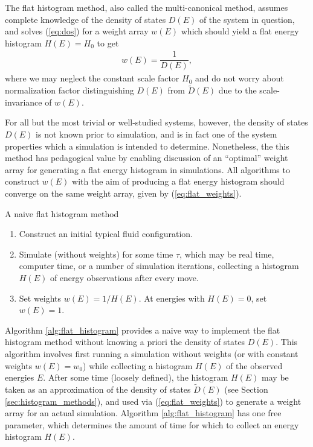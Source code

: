 \documentclass[11pt]{article}
\newcommand{\f}[2]{\dfrac{#1}{#2}} %
\newcommand{\p}[1]{\left(#1\right)} %
\newenvironment{alg}
{\hrulefill\begin{enumerate}}
{\end{enumerate}\hrulefill}
\begin{document}
The flat histogram method, also called the multi-canonical method,
assumes complete knowledge of the density of states $D\p{E}$ of the
system in question, and solves (\ref{eq:dos}) for a weight array
$w\p{E}$ which should yield a flat energy histogram $H\p E=H_0$ to get
\begin{align}
  w\p E=\f1{D\p E},
  \label{eq:flat_weights}
\end{align}
where we may neglect the constant scale factor $H_0$ and do not worry
about normalization factor distinguishing $D\p{E}$ from $\tilde
D\p{E}$ due to the scale-invariance of $w\p{E}$.

For all but the most trivial or well-studied systems, however, the
density of states $D\p{E}$ is not known prior to simulation, and is in
fact one of the system properties which a simulation is intended to
determine. Nonetheless, the this method has pedagogical value by
enabling discussion of an ``optimal'' weight array for generating a
flat energy histogram in simulations. All algorithms to construct
$w\p{E}$ with the aim of producing a flat energy histogram should
converge on the same weight array, given by (\ref{eq:flat_weights}).

\begin{algorithm}[b]
  \caption{A naive flat histogram method}
  \label{alg:flat_histogram}
  \begin{alg}

  \item Construct an initial typical fluid configuration.

  \item Simulate (without weights) for some time $\tau$, which may be
    real time, computer time, or a number of simulation iterations,
    collecting a histogram $H\p{E}$ of energy observations after every
    move.

  \item Set weights $w\p{E}=1/H\p{E}$. At energies with $H\p{E}=0$,
    set $w\p{E}=1$.

  \end{alg}
\end{algorithm}

Algorithm \ref{alg:flat_histogram} provides a naive way to implement
the flat histogram method without knowing a priori the density of
states $D\p{E}$. This algorithm involves first running a simulation
without weights (or with constant weights $w\p{E}=w_0$) while
collecting a histogram $H\p{E}$ of the observed energies $E$. After
some time (loosely defined), the histogram $H\p{E}$ may be taken as an
approximation of the density of states $\tilde D\p{E}$ (see Section
\ref{sec:histogram_methods}), and used via (\ref{eq:flat_weights}) to
generate a weight array for an actual simulation. Algorithm
\ref{alg:flat_histogram} has one free parameter, which determines the
amount of time for which to collect an energy histogram $H\p{E}$.
\end{document}
